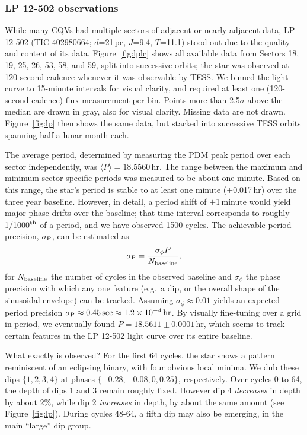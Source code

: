 \documentclass[11pt,twocolumn,tighten]{aastex63}
\begin{document}
\subsubsection{LP 12-502 observations}
While many CQVs had multiple sectors of adjacent or nearly-adjacent
data, LP 12-502 (TIC 402980664; $d$=21\,pc, $J$=9.4, $T$=11.1) stood
out due to the quality and content of its data.  Figure~\ref{fig:lplc}
shows all available data from Sectors 18, 19, 25, 26, 53, 58, and 59,
split into successive orbits; the star was observed at 120-second
cadence whenever it was observable by TESS.  We binned the light curve
to 15-minute intervals for visual clarity, and required at least one
(120-second cadence) flux measurement per bin.  Points more than
2.5$\sigma$ above the median are drawn in gray, also for visual
clarity.  Missing data are not drawn.  Figure~\ref{fig:lp} then shows
the same data, but stacked into successive TESS orbits spanning half a
lunar month each.

The average period, determined by measuring the PDM peak period over
each sector independently, was $\langle P \rangle = 18.5560$\,hr.  The
range between the maximum and minimum sector-specific periods was
measured to be about one minute.  Based on this range, the star's
period is stable to at least one minute ($\pm$0.017\,hr) over the
three year baseline.  However, in detail, a period shift of
$\pm$1\,minute would yield major phase drifts over the baseline; that
time interval corresponds to roughly 1/1000$^{\rm th}$ of a period,
and we have observed 1500 cycles.  The achievable period precision,
$\sigma_{\rm P}$, can be estimated as
\begin{equation}
  \sigma_{\rm P} = \frac { \sigma_{\phi} P } { N_{\rm baseline} },
\end{equation}
for $N_{\rm baseline}$ the number of cycles in the observed baseline
and $\sigma_{\phi}$ the phase precision with which any one feature
(e.g.~a dip, or the overall shape of the sinusoidal envelope) can be
tracked.  Assuming $\sigma_{\phi} \approx 0.01$ yields an expected
period precision $\sigma_{\rm P} \approx 0.45\,{\rm sec} \approx
1.2\times 10^{-4}\,{\rm hr}$.  By visually fine-tuning over a grid in
period, we eventually found $P=18.5611 \pm 0.0001$\,hr, which seems to
track certain features in the LP 12-502 light curve over its entire
baseline.

What exactly is observed?  For the first 64 cycles, the star shows a
pattern reminiscent of an eclipsing binary, with four obvious local
minima.  We dub these dips $\{ 1, 2, 3, 4 \}$ at phases $\{ -0.28,
-0.08, 0, 0.25 \}$, respectively.  Over cycles 0 to 64, the depth of
dips 1 and 3 remain roughly fixed.  However dip 4 {\it decreases} in
depth by about 2\%, while dip 2 {\it increases} in depth, by about the
same amount (see Figure~\ref{fig:lp}).  During cycles 48-64, a fifth
dip may also be emerging, in the main ``large'' dip group.
\end{document}
